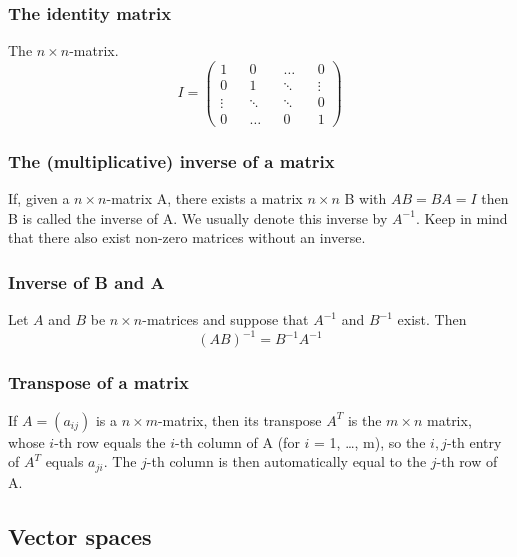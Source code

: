 \documentclass{article}
\begin{document}
			\subsubsection{The identity matrix}
			The $n\times n$-matrix.
			\begin{equation*}
				I = \begin{pmatrix}
					1 && 0 && \dots && 0 \\
					0 && 1 && \ddots && \vdots\\
					\vdots && \ddots && \ddots && 0 \\
					0 && \dots && 0 && 1
				\end{pmatrix}
			\end{equation*}
			
			\subsubsection{The (multiplicative) inverse of a matrix}
			If, given a $n\times n$-matrix A, there exists a matrix $n\times n$ B with $AB = BA = I$ then B is called the inverse of A. We usually denote this inverse by $A^{-1}$. Keep in mind that there also exist non-zero matrices without an inverse.
			
			\subsubsection{Inverse of B and A}
			Let $A$ and $B$ be $n \times n$-matrices and suppose that $A^{-1}$ and $B^{-1}$ exist. Then 
			\begin{equation*}
				(AB)^{-1} = B^{-1}A^{-1}
			\end{equation*}
			
			\subsubsection{Transpose of a matrix}
			If $A = (a_{ij})$ is a $n \times m$-matrix, then its transpose $A^T$ is the $m \times n$ matrix, whose $i$-th row equals the $i$-th column of A (for $i$ = 1, \dots, m), so the $i,j$-th entry of $A^T$ equals $a_{ji}$. The $j$-th column is then automatically equal to the $j$-th row of A.
			
		\subsection{Vector spaces}
\end{document}
